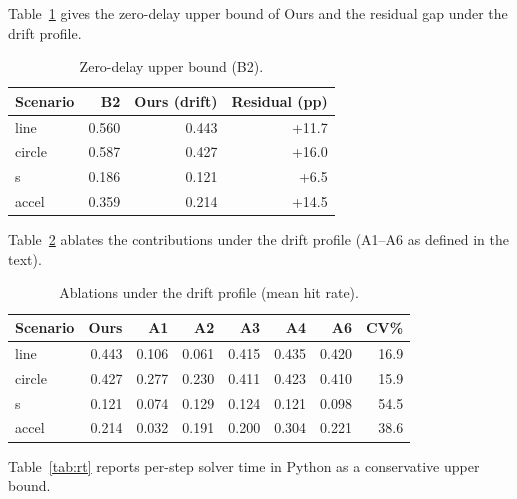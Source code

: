 \documentclass[journal]{IEEEtran}
\begin{document}
Table~\ref{tab:b2} gives the zero-delay upper bound of Ours and the residual gap under the drift profile.

\begin{table}[t]\centering\small

\caption{Zero-delay upper bound (B2).}

\label{tab:b2}\begin{tabular}{lrrr}

\toprule Scenario & B2 & Ours (drift) & Residual (pp)\\ \midrule

line & 0.560 & 0.443 & +11.7\\

circle & 0.587 & 0.427 & +16.0\\

s & 0.186 & 0.121 & +6.5\\

accel & 0.359 & 0.214 & +14.5\\

\bottomrule\end{tabular}\end{table}
Table~\ref{tab:abl} ablates the contributions under the drift profile (A1--A6 as defined in the text).

\begin{table}[t]\centering\small

\caption{Ablations under the drift profile (mean hit rate).}

\label{tab:abl}\begin{tabular}{lrrrrrrr}

\toprule Scenario & Ours & A1 & A2 & A3 & A4 & A6 & CV\%\\ \midrule

line & 0.443 & 0.106 & 0.061 & 0.415 & 0.435 & 0.420 & 16.9\\

circle & 0.427 & 0.277 & 0.230 & 0.411 & 0.423 & 0.410 & 15.9\\

s & 0.121 & 0.074 & 0.129 & 0.124 & 0.121 & 0.098 & 54.5\\

accel & 0.214 & 0.032 & 0.191 & 0.200 & 0.304 & 0.221 & 38.6\\

\bottomrule\end{tabular}\end{table}
Table~\ref{tab:rt} reports per-step solver time in Python as a conservative upper bound.
\end{document}
